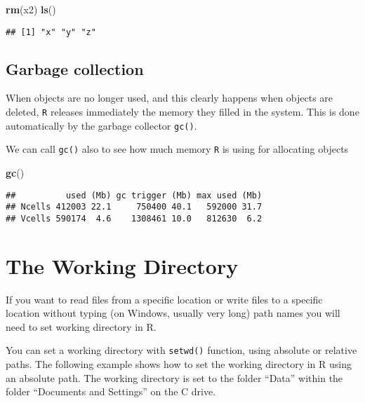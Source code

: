 \documentclass[]{book}
\newenvironment{Shaded}{\begin{snugshade}}{\end{snugshade}}
\newcommand{\KeywordTok}[1]{\textcolor[rgb]{0.13,0.29,0.53}{\textbf{{#1}}}}
\newcommand{\NormalTok}[1]{{#1}}
\begin{document}
\begin{Shaded}
\begin{Highlighting}[]
\KeywordTok{rm}\NormalTok{(x2)}
\KeywordTok{ls}\NormalTok{()}
\end{Highlighting}
\end{Shaded}

\begin{verbatim}
## [1] "x" "y" "z"
\end{verbatim}

\subsection{Garbage collection}\label{garbage-collection}

When objects are no longer used, and this clearly happens when objects
are deleted, \texttt{R} releases immediately the memory they filled in
the system. This is done automatically by the garbage collector
\texttt{gc()}.

We can call \texttt{gc()} also to see how much memory \texttt{R} is
using for allocating objects

\begin{Shaded}
\begin{Highlighting}[]
\KeywordTok{gc}\NormalTok{()}
\end{Highlighting}
\end{Shaded}

\begin{verbatim}
##          used (Mb) gc trigger (Mb) max used (Mb)
## Ncells 412003 22.1     750400 40.1   592000 31.7
## Vcells 590174  4.6    1308461 10.0   812630  6.2
\end{verbatim}

\section{The Working Directory}\label{the-working-directory}

If you want to read files from a specific location or write files to a
specific location without typing (on Windows, usually very long) path
names you will need to set working directory in R.

You can set a working directory with \texttt{setwd()} function, using
absolute or relative paths. The following example shows how to set the
working directory in R using an absolute path. The working directory is
set to the folder ``Data'' within the folder ``Documents and Settings''
on the C drive.
\end{document}
